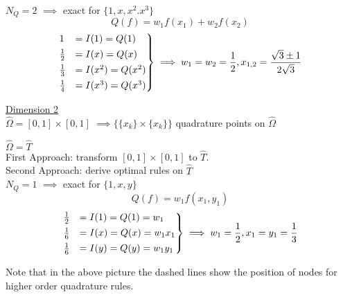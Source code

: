 $N_Q = 2$ $\implies$ exact for $\{1,x,x^2.x^3\}$
\begin{equation*}
	Q(f)= w_1f(x_1) + w_2f(x_2)
\end{equation*}
\begin{align*}
\begin{rcases}
	1 &= I(1)=Q(1)  \\
	\frac{1}{2} &= I(x)= Q(x)  \\
	\frac{1}{3}&=I(x^2)= Q(x^2) \\
	\frac{1}{4}&=I(x^3)= Q(x^3)
\end{rcases} \implies w_1=w_2= \frac{1}{2}, x_{1,2} = \frac{\sqrt{3}\pm 1}{2\sqrt{3}}
\end{align*}

\underline{Dimension 2}\\
$\hat{\Omega} = [0,1]\times [0,1]$ $\implies \{\{x_k\}\times\{x_k\} \}$ quadrature points on $\hat{\Omega}$

$\hat{\Omega} = \hat{T}$\\
First Approach: transform $[0,1]\times [0,1]$ to $\hat{T}$.\\

Second Approach: derive optimal rules on $\hat{T}$\\
$N_Q = 1$ $\implies$ exact for $\{1,x,y\}$
\begin{equation*}
Q(f)= w_1f(x_1,y_1)
\end{equation*}
\begin{align*}
\begin{rcases}
\frac{1}{2}&= I(1)= Q(1) = w_1  \\
\frac{1}{6}&= I(x)= Q(x) = w_1x_1  \\
\frac{1}{6}&= I(y)= Q(y) = w_1y_1\\
\end{rcases} \implies w_1= \frac{1}{2}, x_1=y_1 = \frac{1}{3}
\end{align*}

Note that in the above picture the dashed lines show the position of nodes for higher order quadrature rules.
